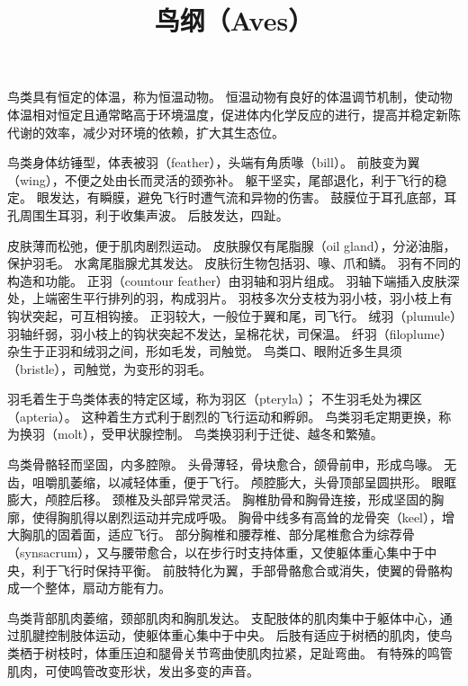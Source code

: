 \documentclass[11pt]{article}
\title{鸟纲（Aves）}
\date{}
\begin{document}
  \maketitle

  \linenumbers
鸟类具有恒定的体温，称为恒温动物。
恒温动物有良好的体温调节机制，使动物体温相对恒定且通常略高于环境温度，促进体内化学反应的进行，提高并稳定新陈代谢的效率，减少对环境的依赖，扩大其生态位。

\newline

鸟类身体纺锤型，体表被羽（feather），头端有角质喙（bill）。
前肢变为翼（wing），不便之处由长而灵活的颈弥补。
躯干坚实，尾部退化，利于飞行的稳定。
眼发达，有瞬膜，避免飞行时遭气流和异物的伤害。
鼓膜位于耳孔底部，耳孔周围生耳羽，利于收集声波。
后肢发达，四趾。

\newline

皮肤薄而松弛，便于肌肉剧烈运动。
皮肤腺仅有尾脂腺（oil gland），分泌油脂，保护羽毛。
水禽尾脂腺尤其发达。
皮肤衍生物包括羽、喙、爪和鳞。
羽有不同的构造和功能。
正羽（countour feather）由羽轴和羽片组成。
羽轴下端插入皮肤深处，上端密生平行排列的羽，构成羽片。
羽枝多次分支枝为羽小枝，羽小枝上有钩状突起，可互相钩接。
正羽较大，一般位于翼和尾，司飞行。
绒羽（plumule）羽轴纤弱，羽小枝上的钩状突起不发达，呈棉花状，司保温。
纤羽（filoplume）杂生于正羽和绒羽之间，形如毛发，司触觉。
鸟类口、眼附近多生具须（bristle），司触觉，为变形的羽毛。

\newline

羽毛着生于鸟类体表的特定区域，称为羽区（pteryla）；
不生羽毛处为裸区（apteria）。
这种着生方式利于剧烈的飞行运动和孵卵。
鸟类羽毛定期更换，称为换羽（molt），受甲状腺控制。
鸟类换羽利于迁徙、越冬和繁殖。

\newline

鸟类骨骼轻而坚固，内多腔隙。
头骨薄轻，骨块愈合，颌骨前申，形成鸟喙。
无齿，咀嚼肌萎缩，以减轻体重，便于飞行。
颅腔膨大，头骨顶部呈圆拱形。
眼眶膨大，颅腔后移。
颈椎及头部异常灵活。
胸椎肋骨和胸骨连接，形成坚固的胸廓，使得胸肌得以剧烈运动并完成呼吸。
胸骨中线多有高耸的龙骨突（keel），增大胸肌的固着面，适应飞行。
部分胸椎和腰荐椎、部分尾椎愈合为综荐骨（synsacrum），又与腰带愈合，以在步行时支持体重，又使躯体重心集中于中央，利于飞行时保持平衡。
前肢特化为翼，手部骨骼愈合或消失，使翼的骨骼构成一个整体，扇动方能有力。

\newline

鸟类背部肌肉萎缩，颈部肌肉和胸肌发达。
支配肢体的肌肉集中于躯体中心，通过肌腱控制肢体运动，使躯体重心集中于中央。
后肢有适应于树栖的肌肉，使鸟类栖于树枝时，体重压迫和腿骨关节弯曲使肌肉拉紧，足趾弯曲。
有特殊的鸣管肌肉，可使鸣管改变形状，发出多变的声音。
\end{document}
